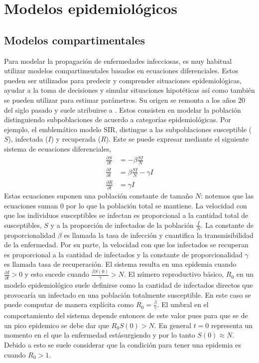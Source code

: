 \chapter{Modelos epidemiológicos} \label{chp:epi_models}

\section{Modelos compartimentales}

Para modelar la propagación de enfermedades infecciosas, es muy habitual utilizar modelos compartimentales basados en ecuaciones diferenciales. Estos pueden ser utilizados para predecir y comprender situaciones epidemiológicas, ayudar a la toma de decisiones y simular situaciones hipotéticas así como también se pueden utilizar para estimar parámetros. Su origen se remonta a los años 20 del siglo pasado y suele atribuirse a \cite{Kermack1927}. Estos consisten en modelar la población distinguiendo subpoblaciones de acuerdo a categorías epidemiológicas. Por ejemplo, el emblemático modelo SIR, distingue a las subpoblaciones susceptible ($S$), infectada ($I$) y recuperada ($R$). Este se puede expresar mediante el siguiente sistema de ecuaciones diferenciales,
\begin{align} \label{eq:sir}
    \frac{\partial S}{\partial t} &= -\beta \frac{SI}{N}\\
    \frac{\partial I}{\partial t} &= \beta \frac{SI}{N} - \gamma I \\
    \frac{\partial R}{\partial t} &= \gamma I
\end{align}
Estas ecuaciones suponen una población constante de tamaño $N$: notemos que las ecuaciones suman 0 por lo que la población total se mantiene. La velocidad con que los individuos susceptibles se infectan es proporcional a la cantidad total de susceptibles, $S$ y a la proporción de infectados de la población $\frac{I}{N}$. La constante de proporcionalidad $\beta$ es llamada la tasa de infección y cuantifica la transmisibilidad de la enfermedad. Por su parte, la velocidad con que los infectados se recuperan es proporcional a la cantidad de infectados y la constante de proporcionalidad $\gamma$ es llamada tasa de recuperación. El sistema resulta en una epidemia cuando $\frac{\partial I}{\partial t} > 0$ y esto sucede cuando $\frac{\beta S(0)}{\gamma} > N$. El número reproductivo básico, $R_0$ en un modelo epidemiológico suele definirse como la cantidad de infectados directos que provocaría un infectado en una población totalmente susceptible. En este caso se puede computar de manera explícita como $R_0 = \frac{\beta}{\gamma}$. El umbral en el comportamiento del sistema depende entonces de este valor pues para que se de un pico epidemico se debe dar que $R_0 S(0) > N$.  En general $t = 0$ representa un momento en el que la enfermedad estásurgiendo y por lo tanto $S(0) \approx N$. Debido a esto se suele considerar que la condición para tener una epidemia es cuando $R_0 > 1$. 

